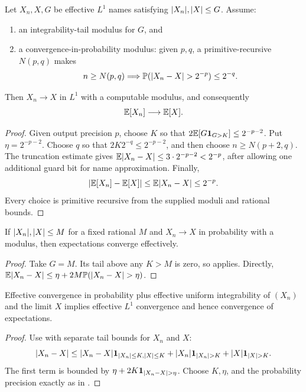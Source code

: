 \begin{theorem}\label{thm:dct}
Let \(X_n,X,G\) be effective \(L^1\) names satisfying
\(\lvert X_n\rvert,\lvert X\rvert\le G\).  Assume:
\begin{enumerate}
\item an integrability-tail modulus for \(G\), and
\item a convergence-in-probability modulus: given \(p,q\), a
  primitive-recursive \(N(p,q)\) makes
  \[
   n\ge N(p,q)\Longrightarrow
   \mathbb P(\lvert X_n-X\rvert>2^{-p})\le2^{-q}.
  \]
\end{enumerate}
Then \(X_n\to X\) in \(L^1\) with a computable modulus, and consequently
\[
 \mathbb E[X_n]\longrightarrow\mathbb E[X].
\]
\end{theorem}

\begin{proof}
Given output precision \(p\), choose \(K\) so that
\(2\mathbb E[G\mathbf 1_{G>K}]\le2^{-p-2}\).  Put
\(\eta=2^{-p-2}\).  Choose \(q\) so that
\(2K2^{-q}\le2^{-p-2}\), and then choose
\(n\ge N(p+2,q)\).  The truncation estimate gives
\(\mathbb E\lvert X_n-X\rvert\le3\cdot2^{-p-2}<2^{-p}\), after allowing one additional guard
bit for name approximation.  Finally,
\[
 \lvert \mathbb E[X_n]-\mathbb E[X]\rvert\le\mathbb E\lvert X_n-X\rvert\le2^{-p}.
\]
Every choice is primitive recursive from the supplied moduli and rational
bounds.
\end{proof}

\begin{corollary}\label{cor:bounded-convergence}
If \(\lvert X_n\rvert,\lvert X\rvert\le M\) for a fixed rational \(M\) and \(X_n\to X\) in
probability with a modulus, then expectations converge effectively.
\end{corollary}

\begin{proof}
Take \(G=M\).  Its tail above any \(K>M\) is zero, so
 applies.  Directly,
\(\mathbb E\lvert X_n-X\rvert\le\eta+2M\mathbb P(\lvert X_n-X\rvert>\eta)\).
\end{proof}

\begin{theorem}\label{thm:vitali}
Effective convergence in probability plus effective uniform integrability of
\((X_n)\) and the limit \(X\) implies effective \(L^1\) convergence and hence
convergence of expectations.
\end{theorem}

\begin{proof}
Use  with separate tail bounds for \(X_n\) and \(X\):
\[
 \lvert X_n-X\rvert\le
 \lvert X_n-X\rvert\mathbf 1_{\lvert X_n\rvert\le K,\lvert X\rvert\le K}
 +\lvert X_n\rvert\mathbf 1_{\lvert X_n\rvert>K}
 +\lvert X\rvert\mathbf 1_{\lvert X\rvert>K}.
\]
The first term is bounded by
\(\eta+2K\mathbf 1_{\lvert X_n-X\rvert>\eta}\).  Choose \(K,\eta\), and the probability
precision exactly as in .
\end{proof}

